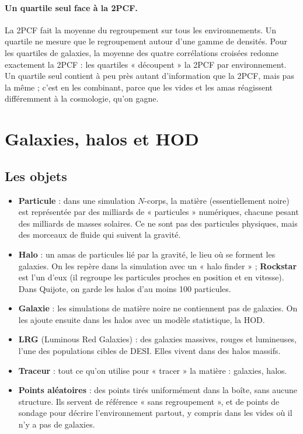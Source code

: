 \documentclass[11pt]{article}
\begin{document}
\paragraph{Un quartile seul face à la 2PCF.} La 2PCF fait la moyenne du regroupement sur tous les environnements. Un quartile ne mesure que le regroupement autour d'une gamme de densités. Pour les quartiles de galaxies, la moyenne des quatre corrélations croisées redonne exactement la 2PCF : les quartiles « découpent » la 2PCF par environnement. Un quartile seul contient à peu près autant d'information que la 2PCF, mais pas la même ; c'est en les combinant, parce que les vides et les amas réagissent différemment à la cosmologie, qu'on gagne.

\section{Galaxies, halos et HOD}

\subsection{Les objets}
\begin{itemize}
\item \textbf{Particule} : dans une simulation $N$-corps, la matière (essentiellement noire) est représentée par des milliards de « particules » numériques, chacune pesant des milliards de masses solaires. Ce ne sont pas des particules physiques, mais des morceaux de fluide qui suivent la gravité.
\item \textbf{Halo} : un amas de particules lié par la gravité, le lieu où se forment les galaxies. On les repère dans la simulation avec un « halo finder » ; \textbf{Rockstar} est l'un d'eux (il regroupe les particules proches en position et en vitesse). Dans Quijote, on garde les halos d'au moins 100 particules.
\item \textbf{Galaxie} : les simulations de matière noire ne contiennent pas de galaxies. On les ajoute ensuite dans les halos avec un modèle statistique, la HOD.
\item \textbf{LRG} (Luminous Red Galaxies) : des galaxies massives, rouges et lumineuses, l'une des populations cibles de DESI. Elles vivent dans des halos massifs.
\item \textbf{Traceur} : tout ce qu'on utilise pour « tracer » la matière : galaxies, halos.
\item \textbf{Points aléatoires} : des points tirés uniformément dans la boîte, sans aucune structure. Ils servent de référence « sans regroupement », et de points de sondage pour décrire l'environnement partout, y compris dans les vides où il n'y a pas de galaxies.
\end{itemize}
\end{document}
